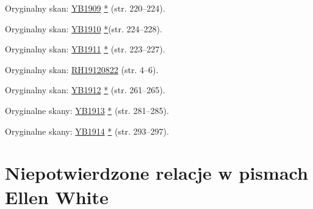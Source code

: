 
Oryginalny skan: \href{https://documents.adventistarchives.org/Yearbooks/YB1909.pdf#search=Yearbook%201909}{YB1909} \href{https://forgotten-pillar.s3.us-east-2.amazonaws.com/YB1909.pdf}{*} (str. 220--224).


Oryginalny skan: \href{https://documents.adventistarchives.org/Yearbooks/YB1910.pdf#search=Yearbook%201910}{YB1910} \href{https://forgotten-pillar.s3.us-east-2.amazonaws.com/YB1910.pdf}{*}(str. 224--228).


Oryginalny skan: \href{https://documents.adventistarchives.org/Yearbooks/YB1911.pdf#search=Yearbook%201910}{YB1911} \href{https://forgotten-pillar.s3.us-east-2.amazonaws.com/YB1911.pdf}{*} (str. 223--227).


Oryginalny skan: \href{https://adventistdigitallibrary.org/adl-351682/advent-review-and-sabbath-herald-august-22-1912?view_only=true&solr_nav%5Bid%5D=ff4d7f3f77b9bdf9e9ac&solr_nav%5Bpage%5D=0&solr_nav%5Boffset%5D=15}{RH19120822} (str. 4--6).


Oryginalny skan: \href{https://documents.adventistarchives.org/Yearbooks/YB1912.pdf#search=Yearbook%201910}{YB1912} \href{https://forgotten-pillar.s3.us-east-2.amazonaws.com/YB1912.pdf}{*} (str. 261--265).


Oryginalne skany: \href{https://documents.adventistarchives.org/Yearbooks/YB1913.pdf#search=Yearbook%201913}{YB1913} \href{https://forgotten-pillar.s3.us-east-2.amazonaws.com/YB1913.pdf}{*} (str. 281--285).


Oryginalne skany: \href{https://documents.adventistarchives.org/Yearbooks/YB1914.pdf#search=Yearbook%201914}{YB1914} \href{https://forgotten-pillar.s3.us-east-2.amazonaws.com/YB1914.pdf}{*} (str. 293--297).

\section*{Niepotwierdzone relacje w pismach Ellen White}

